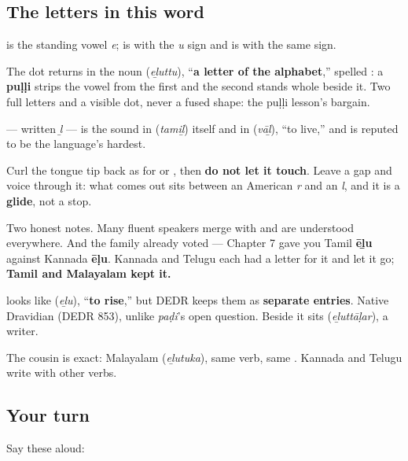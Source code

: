 \subsection*{The letters in this word}
\textbf{} is the standing vowel \emph{e}; \textbf{} is \textbf{} with the \emph{u} sign and \textbf{} is \textbf{} with the same sign.

The dot returns in the noun \textbf{} (\emph{eḻuttu}), \textquotedblleft{}\textbf{a letter of the alphabet},\textquotedblright{} spelled \textbf{   }: a \textbf{puḷḷi} strips the vowel from the first \textbf{} and the second \textbf{} stands whole beside it. Two full letters and a visible dot, never a fused shape: the puḷḷi lesson's bargain.

\begin{sounds}
\textbf{} — written \emph{ḻ} — is the sound in \textbf{} (\emph{tamiḻ}) itself and in \textbf{} (\emph{vāḻ}), \textquotedblleft{}to live,\textquotedblright{} and is reputed to be the language's hardest.

Curl the tongue tip back as for \textbf{} or \textbf{}, then \textbf{do not let it touch}. Leave a gap and voice through it: what comes out sits between an American \emph{r} and an \emph{l}, and it is a \textbf{glide}, not a stop.

Two honest notes. Many fluent speakers merge \textbf{} with \textbf{} and are understood everywhere. And the family already voted — Chapter 7 gave you Tamil \textbf{ēḻu} against Kannada \textbf{ēḷu}. Kannada and Telugu each had a letter for it and let it go; \textbf{Tamil and Malayalam kept it.}
\end{sounds}

\begin{cousinweb}
\textbf{} looks like \textbf{} (\emph{eḻu}), \textquotedblleft{}\textbf{to rise},\textquotedblright{} but DEDR keeps them as \textbf{separate entries}. Native Dravidian (DEDR 853), unlike \emph{paḍi}'s open question. Beside it sits \textbf{} (\emph{eḻuttāḷar}), a writer.

The cousin is exact: Malayalam \textbf{} (\emph{eḻutuka}), same verb, same \textbf{}. Kannada and Telugu write with other verbs.
\end{cousinweb}

\subsection*{Your turn}
Say these aloud:

